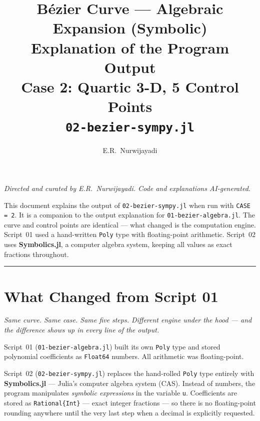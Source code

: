 \documentclass[12pt, a4paper]{article}
\title{%
  \vspace{1cm}
  {\LARGE\bfseries B\'ezier Curve --- Algebraic Expansion (Symbolic)}\\[0.4em]
  {\large Explanation of the Program Output}\\[0.4em]
  {\normalsize Case 2: Quartic 3-D, 5 Control Points}\\[0.4em]
  {\normalsize\texttt{02-bezier-sympy.jl}}
}
\author{E.R.\ Nurwijayadi}
\date{\DTMtoday}
\newcommand{\cd}[1]{\texttt{#1}}
\begin{document}

\maketitle
\thispagestyle{empty}

\begin{center}
\textit{Directed and curated by E.R.\ Nurwijayadi.
Code and explanations AI-generated.}
\end{center}

\begin{center}
\begin{minipage}{0.85\textwidth}
\small
This document explains the output of \cd{02-bezier-sympy.jl}
when run with \cd{CASE = 2}.
It is a companion to the output explanation for \cd{01-bezier-algebra.jl}.
The curve and control points are identical --- what changed is the
computation engine.
Script~01 used a hand-written \cd{Poly} type with floating-point arithmetic.
Script~02 uses \textbf{Symbolics.jl}, a computer algebra system,
keeping all values as exact fractions throughout.
\end{minipage}
\end{center}

\vspace{1em}\hrule\vspace{1.5em}
\tableofcontents
\newpage


\section{What Changed from Script 01}

\textit{Same curve. Same case. Same five steps.
Different engine under the hood ---
and the difference shows up in every line of the output.}

Script~01 (\cd{01-bezier-algebra.jl}) built its own \cd{Poly} type
and stored polynomial coefficients as \cd{Float64} numbers.
All arithmetic was floating-point.

Script~02 (\cd{02-bezier-sympy.jl}) replaces the hand-rolled
\cd{Poly} type entirely with \textbf{Symbolics.jl} --- Julia's
computer algebra system (CAS).
Instead of numbers, the program manipulates \emph{symbolic expressions}
in the variable \cd{u}.
Coefficients are stored as \cd{Rational\{Int\}} --- exact integer
fractions --- so there is no floating-point rounding anywhere
until the very last step when a decimal is explicitly requested.
\end{document}

